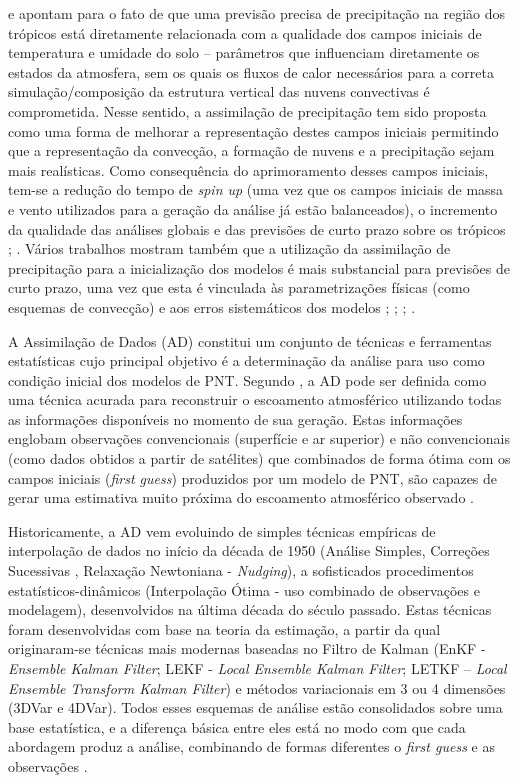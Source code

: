  e  apontam para o fato de que uma previsão precisa de precipitação na região dos trópicos está diretamente relacionada com a qualidade dos campos iniciais de temperatura e umidade do solo – parâmetros que influenciam diretamente os estados da atmosfera, sem os quais os fluxos de calor necessários para a correta simulação/composição da estrutura vertical das nuvens convectivas é comprometida. Nesse sentido, a assimilação de precipitação tem sido proposta como uma forma de melhorar a representação destes campos iniciais permitindo que a representação da convecção, a formação de nuvens e a precipitação sejam mais realísticas. Como consequência do aprimoramento desses campos iniciais, tem-se a redução do tempo de \textit{spin up} (uma vez que os campos iniciais de massa e vento utilizados para a geração da análise já estão balanceados), o incremento da qualidade das análises globais e das previsões de curto prazo sobre os trópicos \cite{heckleyetal90}; \cite{falkovichetal00}. Vários trabalhos mostram também que a utilização da assimilação de precipitação para a inicialização dos modelos é mais substancial para previsões de curto prazo, uma vez que esta é vinculada às parametrizações físicas (como esquemas de convecção) e aos erros sistemáticos dos modelos \cite{kasaharaetal94}; \cite{mathur95}; \cite{zupanskimesinger95}; \cite{nunescocke04}.

A Assimilação de Dados (AD) constitui um conjunto de técnicas e ferramentas estatísticas cujo principal objetivo é a determinação da análise para uso como condição inicial dos modelos de PNT. Segundo , a AD pode ser definida como uma técnica acurada para reconstruir o escoamento atmosférico utilizando todas as informações disponíveis no momento de sua geração. Estas informações englobam observações convencionais (superfície e ar superior) e não convencionais (como dados obtidos a partir de satélites) que combinados de forma ótima com os campos iniciais (\textit{first guess}) produzidos por um modelo de PNT, são capazes de gerar uma estimativa muito próxima do escoamento atmosférico observado \cite{kalnay03}.

Historicamente, a AD vem evoluindo de simples técnicas empíricas de interpolação de dados no início da década de 1950 (Análise Simples, Correções Sucessivas \cite{cressman59}, Relaxação Newtoniana - \textit{Nudging}), a sofisticados procedimentos estatísticos-dinâmicos (Interpolação Ótima - uso combinado de observações e modelagem), desenvolvidos na última década do século passado. Estas técnicas foram desenvolvidas com base na teoria da estimação, a partir da qual originaram-se técnicas mais modernas baseadas no Filtro de Kalman (EnKF - \textit{Ensemble Kalman Filter}; LEKF - \textit{Local Ensemble Kalman Filter}; LETKF – \textit{Local Ensemble Transform Kalman Filter}) e métodos variacionais em 3 ou 4 dimensões (3DVar e 4DVar). Todos esses esquemas de análise estão consolidados sobre uma base estatística, e a diferença básica entre eles está no modo com que cada abordagem produz a análise, combinando de formas diferentes o \textit{first guess} e as observações \cite{kalnay03}.

